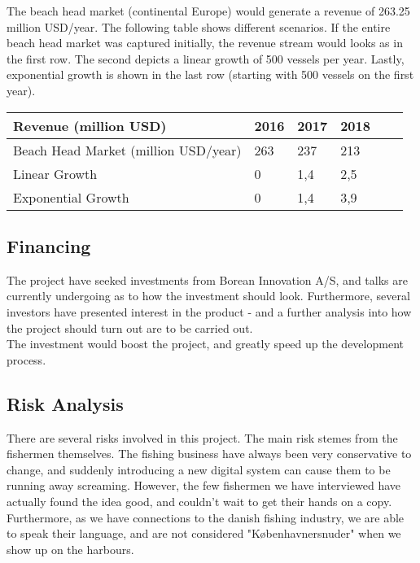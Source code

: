 \documentclass[12pt]{article}
\begin{document}
The beach head market (continental Europe) would generate a revenue of 263.25 million USD/year. The following table shows different scenarios. If the entire beach head market was captured initially, the revenue stream would looks as in the first row. The second depicts a linear growth of 500 vessels per year. Lastly, exponential growth is shown in the last row (starting with 500 vessels on the first year).\\ 

\begin{center}
\begin{tabular}{l*{4}{l}l}
Revenue (million USD)									& 2016 & 2017 & 2018\\			
\hline
Beach Head Market (million USD/year) 					& 263 	& 237 	& 213\\
Linear Growth					 						& 0 	& 1,4 	& 2,5\\
Exponential Growth		 								& 0 	& 1,4 	& 3,9\\
\end{tabular}
\end{center}

\subsection{Financing}
The project have seeked investments from Borean Innovation A/S, and talks are currently undergoing as to how the investment should look. Furthermore, several investors have presented interest in the product - and a further analysis into how the project should turn out are to be carried out.\\

The investment would boost the project, and greatly speed up the development process. 

\subsection{Risk Analysis}
There are several risks involved in this project. The main risk stemes from the fishermen themselves. The fishing business have always been very conservative to change, and suddenly introducing a new digital system can cause them to be running away screaming. However, the few fishermen we have interviewed have actually found the idea good, and couldn't wait to get their hands on a copy.\\

Furthermore, as we have connections to the danish fishing industry, we are able to speak their language, and are not considered "Københavnersnuder" when we show up on the harbours. 
\end{document}
